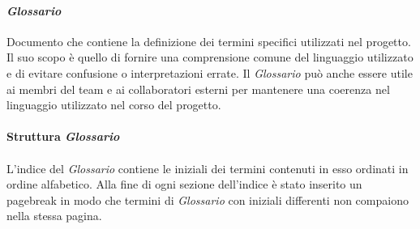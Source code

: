 \paragraph{\textit{Glossario}}
Documento che contiene la definizione dei termini specifici utilizzati nel progetto. 
Il suo scopo è quello di fornire una comprensione comune del linguaggio utilizzato e di evitare confusione o 
interpretazioni errate. Il \textit{Glossario} può anche essere utile ai membri del team e ai collaboratori esterni per 
mantenere una coerenza nel linguaggio utilizzato nel corso del progetto.
\\\\
\textbf{Struttura \textit{Glossario}} 
\\\\
L'indice del \textit{Glossario} contiene le iniziali dei termini contenuti in esso ordinati in ordine alfabetico.
Alla fine di ogni sezione dell'indice è stato inserito un pagebreak in modo che termini di \textit{Glossario} con iniziali differenti non compaiono nella 
stessa pagina.